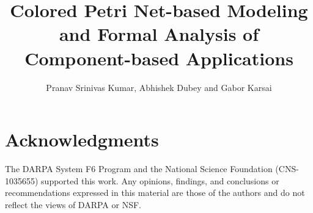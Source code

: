 \documentclass{llncs}
\begin{document}
\title{Colored Petri Net-based Modeling and Formal Analysis of Component-based Applications}

\author{Pranav Srinivas Kumar, Abhishek Dubey and Gabor Karsai}
\maketitle 
\vspace{-0.3in}









\section*{Acknowledgments}\label{sec:Acknowledgments}

\vspace{-0.1in}

The DARPA System F6 Program and the National
Science Foundation (CNS-1035655) supported
this work. Any opinions, findings, and conclusions or recommendations expressed
in this material are those of the authors and do not reflect the views of
DARPA or NSF. 

\vspace{-0.2in}



\end{document}
